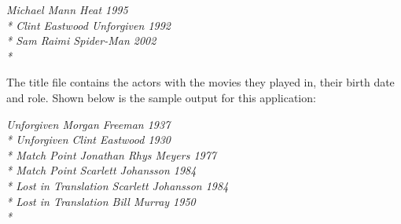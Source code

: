 \documentclass[Movies.tex]{subfiles}
\begin{document}
\textit{Michael Mann	Heat	1995 \\*
Clint Eastwood	Unforgiven	1992 \\*
Sam Raimi	Spider-Man	2002 \\*}

The title file contains the actors with the movies they played in, their birth date and role. Shown below is the sample output for this application:

\textit{Unforgiven	Morgan Freeman	1937 \\*
Unforgiven	Clint Eastwood	1930 \\*
Match Point	Jonathan Rhys Meyers	1977 \\*
Match Point	Scarlett  Johansson	1984 \\* 
Lost in Translation	Scarlett  Johansson	1984 \\*
Lost in Translation	Bill Murray	1950 \\*}
\end{document}
